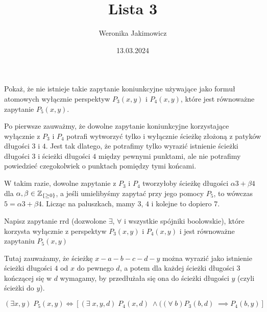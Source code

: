 \documentclass{article}
\title{Lista 3}
\author{Weronika Jakimowicz}
\date{13.03.2024}
\begin{document}
\maketitle

\begin{problem}
  Pokaż, że nie istnieje takie zapytanie koniunkcyjne używające jako formuł atomowych wyłącznie perspektyw $P_3(x, y)$ i $P_4(x, y)$, które jest równoważne zapytanie $P_5(x, y)$.
\end{problem}

\begin{solution}
  Po pierwsze zauważmy, że dowolne zapytanie koniunkcyjne korzystające wyłącznie z $P_3$ i $P_4$ potrafi wytworzyć tylko i wyłącznie ścieżkę złożoną z patyków długości $3$ i $4$. Jest tak dlatego, że potrafimy tylko wyrazić istnienie ścieżki długości $3$ i ścieżki długości $4$ między pewnymi punktami, ale nie potrafimy powiedzieć czegokolwiek o punktach pomiędzy tymi końcami.

  W takim razie, dowolne zapytanie z $P_3$ i $P_4$ tworzyłoby ścieżkę długości $\alpha 3+\beta 4$ dla $\alpha, \beta\in \operatorname{\mathbb{Z}}_{\{\geq0\}}$, a jeśli umielibyśmy zapytać przy jego pomocy $P_5$, to wówczas $5=\alpha 3+\beta 4$. Licząc na paluszkach, mamy $3$, $4$ i kolejne to dopiero $7$.
\end{solution}

\begin{problem}
  Napisz zapytanie rrd (dozwolone $\exists$, $\forall$ i wszystkie spójniki boolowskie), które korzysta wyłącznie z perspektyw $P_3(x, y)$ i $P_4(x, y)$ i jest równoważne zapytaniu $P_5(x, y)$
\end{problem}

\begin{solution}
  Tutaj zauważamy, że ścieżkę $x-a-b-c-d-y$ można wyrazić jako istnienie ścieżki długości $4$ od $x$ do pewnego $d$, a potem dla każdej ścieżki długości $3$ kończącej się w $d$ wymagamy, by przedłużała się ona do ścieżki długości $y$ (czyli ścieżki do $y$).

  $$(\exists x,y)\;P_5(x,y)\iff [ (\exists\;x,y, d)\;P_4(x, d)\;\land ((\forall\;b)P_3(b, d)\;\implies P_4(b, y) ]$$
\end{solution}

\begin{problem}
\end{problem}
\end{document}
